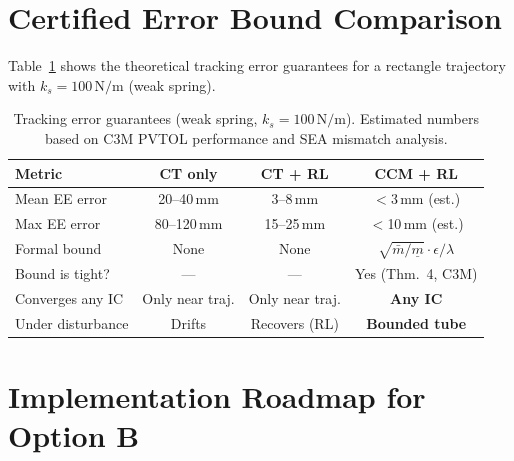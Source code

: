 \documentclass[11pt,a4paper]{article}
\begin{document}
\section{Certified Error Bound Comparison}
\label{sec:bounds}

Table~\ref{tab:error_bounds} shows the theoretical tracking error guarantees for
a rectangle trajectory with $k_s = 100\,\text{N/m}$ (weak spring).

\begin{table}[ht]
\centering
\renewcommand{\arraystretch}{1.25}
\caption{Tracking error guarantees (weak spring, $k_s = 100\,\text{N/m}$).
  Estimated numbers based on C3M PVTOL performance and SEA mismatch analysis.}
\label{tab:error_bounds}
\small
\begin{tabular}{lccc}
\toprule
\textbf{Metric} & \textbf{CT only} & \textbf{CT + RL} & \textbf{CCM + RL} \\
\midrule
Mean EE error & 20--40\,mm & 3--8\,mm & $<$3\,mm (est.) \\
Max EE error  & 80--120\,mm & 15--25\,mm & $<$10\,mm (est.) \\
Formal bound  & None & None & $\sqrt{\bar m/\underline m}\cdot\epsilon/\lambda$ \\
Bound is tight? & --- & --- & Yes (Thm.~4, C3M) \\
Converges any IC & Only near traj. & Only near traj. & \textbf{Any IC} \\
Under disturbance & Drifts & Recovers (RL) & \textbf{Bounded tube} \\
\bottomrule
\end{tabular}
\end{table}

\section{Implementation Roadmap for Option B}
\label{sec:impl}
\end{document}
